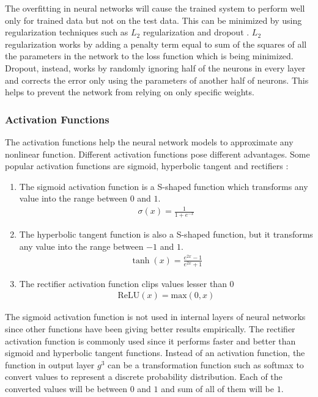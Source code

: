 \documentclass[a4paper, 11pt]{article}
\begin{document}
The overfitting in neural networks will cause the trained system to perform well only for trained data but not on the test data. This can be minimized by using regularization techniques such as $L_2$ regularization and dropout \parencite{Hinton2012}. $L_2$ regularization works by adding a penalty term equal to sum of the squares of all the parameters in the network to the loss function which is being minimized. Dropout, instead, works by randomly ignoring half of the neurons in every layer and corrects the error only using the parameters of another half of neurons. This helps to prevent the network from relying on only specific weights.

\subsubsection{Activation Functions}

The activation functions help the neural network models to approximate any nonlinear function. Different activation functions pose different advantages. Some popular activation functions are sigmoid, hyperbolic tangent and rectifiers \parencite{Goldberg2016}:

\begin{enumerate}

\item The sigmoid activation function is a S-shaped function which transforms any value into the range between $0$ and $1$.  
\begin{align*}
\sigma (x) = \frac{1}{1 + e^{-x}}
\end{align*}

\item The hyperbolic tangent function is also a S-shaped function, but it transforms any value into the range between $-1$ and $1$.
\begin{align*}
\tanh (x) = \frac{e^{2x}-1}{e^{2x}+1}
\end{align*}

\item The rectifier activation function clips values lesser than $0$
\begin{align*}
\mathrm{ReLU}(x) = \mathrm{max}(0,x)
\end{align*}

\end{enumerate}

The sigmoid activation function is not used in internal layers of neural networks since other functions have been giving better results empirically. The rectifier activation function is commonly used since it performs faster and better than sigmoid and hyperbolic tangent functions. Instead of an activation function, the function in output layer $g^3$ can be a transformation function such as softmax to convert values to represent a discrete probability distribution. Each of the converted values will be between $0$ and $1$ and sum of all of them will be $1$.
\end{document}

